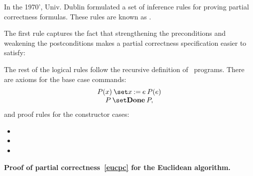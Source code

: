 In the 1970', %
Univ. Dublin formulated a set of inference rules for proving partial
correctness formulas.  These rules are known as .

The first rule captures the fact that strengthening the preconditions
and weakening the postconditions makes a partial correctness
specification easier to satisfy:


The rest of the logical rules follow the recursive definition of \while\ programs.
There are axioms for the base case commands:
\[\begin{array}{c}
  \after{P(x)}{x \assigned e}{P(e)}\\
  \after{P}{\halt}{P},
\end{array}\]
and proof rules for the constructor cases:

\begin{itemize}

\item
{}

\item
{}
        {}

\item
{}
     {}
\end{itemize}

\begin{example}
\textbf{Proof of partial correctness~\eqref{eucpc} for the Euclidean algorithm.}
\end{example}

\begin{editingnotes}
\end{editingnotes}

\endinput

